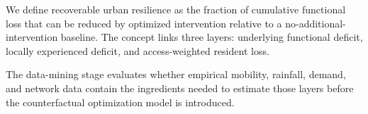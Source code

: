We define recoverable urban resilience as the fraction of cumulative functional loss that can be reduced by optimized intervention relative to a no-additional-intervention baseline. The concept links three layers: underlying functional deficit, locally experienced deficit, and access-weighted resident loss.

The data-mining stage evaluates whether empirical mobility, rainfall, demand, and network data contain the ingredients needed to estimate those layers before the counterfactual optimization model is introduced.
